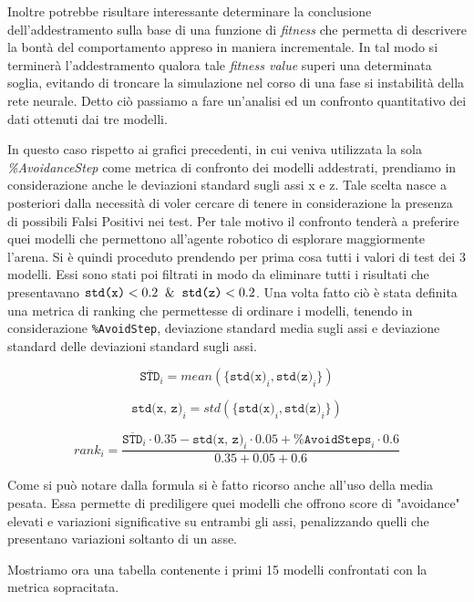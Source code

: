 Inoltre potrebbe risultare interessante determinare la conclusione dell'addestramento sulla base di una funzione di \textit{fitness} che permetta di descrivere la bontà del comportamento appreso in maniera incrementale. In tal modo si terminerà l'addestramento qualora tale \textit{fitness value} superi una determinata soglia, evitando di troncare la simulazione nel corso di una fase si instabilità della rete neurale.
\hfill\break
Detto ciò passiamo a fare un'analisi ed un confronto quantitativo dei dati ottenuti dai tre modelli. 

In questo caso rispetto ai grafici precedenti, in cui veniva utilizzata la sola \textit{\%AvoidanceStep} come  metrica di confronto dei modelli addestrati, prendiamo in considerazione anche le deviazioni standard sugli assi x e z. Tale scelta nasce a posteriori dalla necessità di voler cercare di tenere in considerazione la presenza di possibili Falsi Positivi nei test. Per tale motivo il confronto tenderà a preferire quei modelli che permettono all'agente robotico di esplorare maggiormente l'arena. Si è quindi proceduto prendendo per prima cosa tutti i valori di test dei 3 modelli. Essi sono stati poi filtrati in modo da eliminare tutti i risultati che presentavano $\texttt{std(x)} < 0.2 \And \texttt{std(z)} < 0.2$. Una volta fatto ciò è stata definita una metrica di ranking che permettesse di ordinare i modelli, tenendo in considerazione \texttt{\%AvoidStep}, deviazione standard media sugli assi e deviazione standard delle deviazioni standard sugli assi. 

$$\overline{\texttt{STD}}_i = mean(\{\texttt{std(x)}_i, \texttt{std(z)}_i\})$$

$$\texttt{std(x, z)}_i = std(\{\texttt{std(x)}_i, \texttt{std(z)}_i\})$$

$$rank_i = \frac{\overline{\texttt{STD}}_i \cdot 0.35 - \texttt{std(x, z)}_i \cdot 0.05 + \texttt{\%AvoidSteps}_i \cdot 0.6}{0.35 + 0.05 + 0.6}$$

\hfill\break

Come si può notare dalla formula si è fatto ricorso anche all'uso della media pesata. Essa permette di prediligere quei modelli che offrono score di "avoidance" elevati e variazioni significative su entrambi gli assi, penalizzando quelli che presentano variazioni soltanto di un asse. 

Mostriamo ora una tabella contenente i primi 15 modelli confrontati con la metrica sopracitata.

